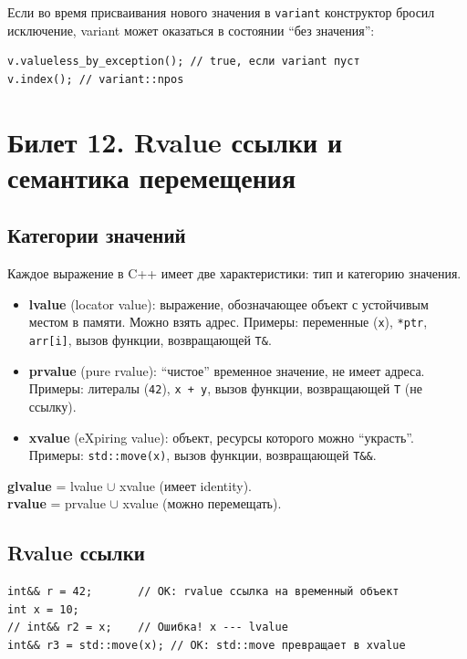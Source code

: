\documentclass[12pt,a4paper]{article}
\begin{document}
Если во время присваивания нового значения в \texttt{variant} конструктор бросил исключение, variant может оказаться в состоянии ``без значения'':
\begin{lstlisting}
v.valueless_by_exception(); // true, если variant пуст
v.index(); // variant::npos
\end{lstlisting}

\section{Билет 12. Rvalue ссылки и семантика перемещения}

\subsection{Категории значений}

Каждое выражение в C++ имеет две характеристики: тип и категорию значения.

\begin{itemize}
    \item \textbf{lvalue} (locator value): выражение, обозначающее объект с устойчивым местом в памяти. Можно взять адрес. Примеры: переменные (\texttt{x}), \texttt{*ptr}, \texttt{arr[i]}, вызов функции, возвращающей \texttt{T\&}.
    \item \textbf{prvalue} (pure rvalue): ``чистое'' временное значение, не имеет адреса. Примеры: литералы (\texttt{42}), \texttt{x + y}, вызов функции, возвращающей \texttt{T} (не ссылку).
    \item \textbf{xvalue} (eXpiring value): объект, ресурсы которого можно ``украсть''. Примеры: \texttt{std::move(x)}, вызов функции, возвращающей \texttt{T\&\&}.
\end{itemize}

\textbf{glvalue} = lvalue $\cup$ xvalue (имеет identity).\\
\textbf{rvalue} = prvalue $\cup$ xvalue (можно перемещать).

\subsection{Rvalue ссылки}

\begin{lstlisting}
int&& r = 42;       // OK: rvalue ссылка на временный объект
int x = 10;
// int&& r2 = x;    // Ошибка! x --- lvalue
int&& r3 = std::move(x); // OK: std::move превращает в xvalue
\end{lstlisting}
\end{document}
